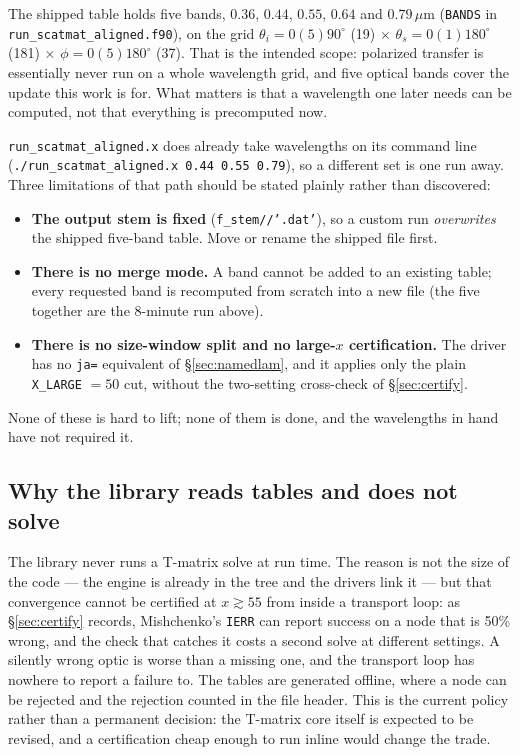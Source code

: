 \documentclass{my_memo}
\newcommand{\code}[1]{\texttt{#1}}
\newcommand{\um}{\ensuremath{\,\mu\mathrm{m}}}
\begin{document}
The shipped table holds five bands, $0.36$, $0.44$, $0.55$, $0.64$ and
$0.79\um$ (\code{BANDS} in \code{run\_scatmat\_aligned.f90}), on the grid
$\theta_i = 0(5)90^\circ$ (19) $\times$ $\theta_s = 0(1)180^\circ$ (181) $\times$
$\phi = 0(5)180^\circ$ (37). That is the intended scope: polarized transfer is
essentially never run on a whole wavelength grid, and five optical bands cover
the update this work is for. What matters is that a wavelength one later needs
can be computed, not that everything is precomputed now.

\code{run\_scatmat\_aligned.x} does already take wavelengths on its command line
(\code{./run\_scatmat\_aligned.x 0.44 0.55 0.79}), so a different set is one run
away. Three limitations of that path should be stated plainly rather than
discovered:
\begin{itemize}
\item \textbf{The output stem is fixed} (\code{f\_stem//'.dat'}), so a custom run
      \emph{overwrites} the shipped five-band table. Move or rename the shipped
      file first.
\item \textbf{There is no merge mode.} A band cannot be added to an existing
      table; every requested band is recomputed from scratch into a new file
      (the five together are the 8-minute run above).
\item \textbf{There is no size-window split and no large-$x$ certification.} The
      driver has no \code{ja=} equivalent of \S\ref{sec:namedlam}, and it applies
      only the plain \code{X\_LARGE} $= 50$ cut, without the two-setting
      cross-check of \S\ref{sec:certify}.
\end{itemize}
None of these is hard to lift; none of them is done, and the wavelengths in hand
have not required it.

\subsection{Why the library reads tables and does not solve}\label{sec:notmatrix}

The library never runs a T-matrix solve at run time. The reason is not the size of
the code --- the engine is already in the tree and the drivers link it --- but
that convergence cannot be certified at $x\gtrsim55$ from inside a transport loop:
as \S\ref{sec:certify} records, Mishchenko's \code{IERR} can report success on a
node that is 50\% wrong, and the check that catches it costs a second solve at
different settings. A silently wrong optic is worse than a missing one, and the
transport loop has nowhere to report a failure to. The tables are generated
offline, where a node can be rejected and the rejection counted in the file
header. This is the current policy rather than a permanent decision: the T-matrix
core itself is expected to be revised, and a certification cheap enough to run
inline would change the trade.
\end{document}
